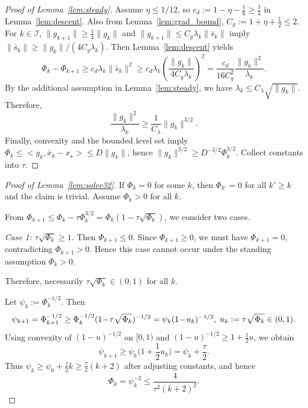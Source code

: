 \documentclass[11pt,a4paper]{article}
\def\ip#1#2{<#1,#2>}%
\newcommand{\ip}[2]{\left\langle #1,#2\right\rangle}
\begin{document}
\begin{proof}[Proof of Lemma~\ref{lem:steady}]
Assume $\eta\le 1/12$, so $c_d:=1-\eta-\frac16\ge \frac34$ in Lemma~\ref{lem:descent}.
Also from Lemma~\ref{lem:grad_bound}, $C_g:=1+\eta+\frac12\le 2$.
For $k\in\mathcal I$, $\|g_{k+1}\|\ge \frac14\|g_k\|$ and $\|g_{k+1}\|\le C_g\lambda_k\|\bar s_k\|$ imply
$\|\bar s_k\|\ge \|g_k\|/(4C_g\lambda_k)$.
Then Lemma~\ref{lem:descent} yields
\[
\Phi_k-\Phi_{k+1}\ge c_d\lambda_k\|\bar s_k\|^2
\ge c_d\lambda_k\left(\frac{\|g_k\|}{4C_g\lambda_k}\right)^2
=\frac{c_d}{16C_g^2}\frac{\|g_k\|^2}{\lambda_k}.
\]
By the additional assumption in Lemma~\ref{lem:steady}, we have $\lambda_k\le C_\lambda\sqrt{\|g_k\|}$.
Therefore,
\[
\frac{\|g_k\|^2}{\lambda_k}\ge \frac{1}{C_\lambda}\|g_k\|^{3/2}.
\]
Finally, convexity and the bounded level set imply $\Phi_k\le \ip{g_k}{\bar x_k-x_\star}\le D\|g_k\|$, hence
$\|g_k\|^{3/2}\ge D^{-3/2}\Phi_k^{3/2}$.
Collect constants into $\tau$.
\end{proof}

\begin{proof}[Proof of Lemma~\ref{lem:solve32}]
If $\Phi_k=0$ for some $k$, then $\Phi_{k'}=0$ for all $k'\ge k$ and the claim is trivial.
Assume $\Phi_k>0$ for all $k$.

From $\Phi_{k+1}\le \Phi_k-\tau \Phi_k^{3/2}=\Phi_k(1-\tau\sqrt{\Phi_k})$, we consider two cases.

\emph{Case 1: $\tau\sqrt{\Phi_k}\ge 1$.}
Then $\Phi_{k+1}\le 0$. Since $\Phi_{k+1}\ge 0$, we must have $\Phi_{k+1}=0$,
contradicting $\Phi_{k+1}>0$.
Hence this case cannot occur under the standing assumption $\Phi_k>0$.

Therefore, necessarily $\tau\sqrt{\Phi_k}\in(0,1)$ for all $k$.

Let $\psi_k:=\Phi_k^{-1/2}$. Then
\[
\psi_{k+1}=\Phi_{k+1}^{-1/2}\ge \Phi_k^{-1/2}(1\!-\!\tau\sqrt{\Phi_k})^{-1/2}\\
=\psi_k(1\!-\!u_k)^{-1/2},\; u_k:=\tau\sqrt{\Phi_k}\in(0,1).
\]
Using convexity of $(1-u)^{-1/2}$ on $[0,1)$ and $(1-u)^{-1/2}\ge 1+\frac12u$, we obtain
\[
\psi_{k+1}\ge \psi_k\Big(1+\frac12 u_k\Big)=\psi_k+\frac{\tau}{2}.
\]
Thus $\psi_k\ge \psi_0+\frac{\tau}{2}k\ge \frac{\tau}{2}(k+2)$ after adjusting constants, and hence
\[
\Phi_k=\psi_k^{-2}\le \frac{4}{\tau^2(k+2)^2}.
\]
\end{proof}
\end{document}
